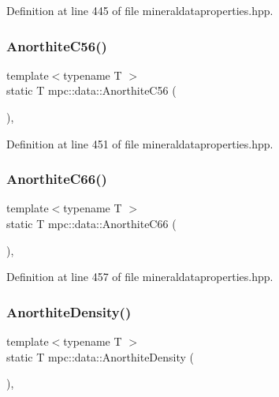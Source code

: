 Definition at line 445 of file mineraldataproperties.\+hpp.

\mbox{\label{namespacempc_1_1data_a6d52b257e6897b49d3e7f5dd2956702d}} 
\subsubsection{\texorpdfstring{Anorthite\+C56()}{AnorthiteC56()}}
{\footnotesize\ttfamily template$<$typename T $>$ \\
static T mpc\+::data\+::\+Anorthite\+C56 (\begin{DoxyParamCaption}{ }\end{DoxyParamCaption})\hspace{0.3cm}{\ttfamily [inline]}, {\ttfamily [static]}}



Definition at line 451 of file mineraldataproperties.\+hpp.

\mbox{\label{namespacempc_1_1data_a36f6458af0647d5c0f96b4ee29da7244}} 
\subsubsection{\texorpdfstring{Anorthite\+C66()}{AnorthiteC66()}}
{\footnotesize\ttfamily template$<$typename T $>$ \\
static T mpc\+::data\+::\+Anorthite\+C66 (\begin{DoxyParamCaption}{ }\end{DoxyParamCaption})\hspace{0.3cm}{\ttfamily [inline]}, {\ttfamily [static]}}



Definition at line 457 of file mineraldataproperties.\+hpp.

\mbox{\label{namespacempc_1_1data_a9e8d5f9dcc2e5f3bb0a82fd7d66d33dd}} 
\subsubsection{\texorpdfstring{Anorthite\+Density()}{AnorthiteDensity()}}
{\footnotesize\ttfamily template$<$typename T $>$ \\
static T mpc\+::data\+::\+Anorthite\+Density (\begin{DoxyParamCaption}{ }\end{DoxyParamCaption})\hspace{0.3cm}{\ttfamily [inline]}, {\ttfamily [static]}}



